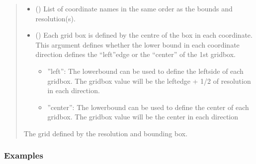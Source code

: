 \documentclass[letterpaper,10pt,english]{sphinxmanual}
\begin{document}
\begin{fulllineitems}
\begin{fulllineitems}
\begin{quote}
\begin{description}
\begin{itemize}
\item {}
\sphinxAtStartPar
{} () \textendash{} List of coordinate names in the same order as the bounds and
resolution(s).

\item {}
\sphinxAtStartPar
{} () \textendash{}
\sphinxAtStartPar
Each grid box is defined by the centre of the box in each
coordinate. This argument defines whether the lower bound in each
coordinate direction defines the “left”\sphinxhyphen{}edge or the “center” of the
1st grid\sphinxhyphen{}box.
\begin{itemize}
\item {}
\sphinxAtStartPar
”left”: The lower\sphinxhyphen{}bound can be used to define the left\sphinxhyphen{}side of
each grid\sphinxhyphen{}box. The grid\sphinxhyphen{}box value will be the left\sphinxhyphen{}edge + 1/2 of
resolution in each direction.

\item {}
\sphinxAtStartPar
”center”: The lower\sphinxhyphen{}bound can be used to define the center of each
grid\sphinxhyphen{}box. The grid\sphinxhyphen{}box value will be the center in each direction

\end{itemize}


\end{itemize}

\sphinxAtStartPar
{} \textendash{} The grid defined by the resolution and bounding box.

\sphinxAtStartPar
{\hyperref[\detokenize{grid:glomar_gridding.grid.Grid}]{}}

\end{description}\end{quote}
\subsubsection*{Examples}


\end{fulllineitems}
\end{fulllineitems}
\end{document}
